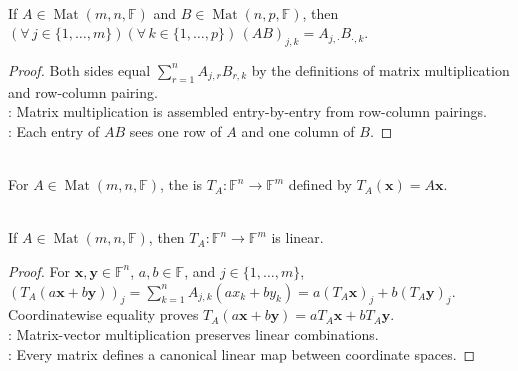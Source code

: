 \begin{proposition} \label{prop:matrix-product-entry-row-column} \\
If $A\in\operatorname{Mat}(m,n,\mathbb{F})$ and $B\in\operatorname{Mat}(n,p,\mathbb{F})$, then $(\forall\,j\in\{1,\ldots,m\})(\forall\,k\in\{1,\ldots,p\})\,(AB)_{j,k}=A_{j,\cdot}B_{\cdot,k}$.
\begin{proof}
Both sides equal $\sum\limits_{r=1}^{n}A_{j,r}B_{r,k}$ by the definitions of matrix multiplication and row-column pairing.\\
: Matrix multiplication is assembled entry-by-entry from row-column pairings.\\
: Each entry of $AB$ sees one row of $A$ and one column of $B$.
\end{proof}
\end{proposition}

\begin{definition} \label{def:linear-map-induced-by-matrix} \\
For $A\in\operatorname{Mat}(m,n,\mathbb{F})$, the  is $T_A:\mathbb{F}^n\to\mathbb{F}^m$ defined by $T_A(\mathbf{x})=A\mathbf{x}$.
\end{definition}

\begin{proposition} \label{prop:matrix-induced-map-linear} \\
If $A\in\operatorname{Mat}(m,n,\mathbb{F})$, then $T_A:\mathbb{F}^n\to\mathbb{F}^m$ is linear.
\begin{proof}
For $\mathbf{x},\mathbf{y}\in\mathbb{F}^n$, $a,b\in\mathbb{F}$, and $j\in\{1,\ldots,m\}$, $(T_A(a\mathbf{x}+b\mathbf{y}))_j=\sum\limits_{k=1}^{n}A_{j,k}(ax_k+by_k)=a(T_A\mathbf{x})_j+b(T_A\mathbf{y})_j$.\\
Coordinatewise equality proves $T_A(a\mathbf{x}+b\mathbf{y})=aT_A\mathbf{x}+bT_A\mathbf{y}$.\\
: Matrix-vector multiplication preserves linear combinations.\\
: Every matrix defines a canonical linear map between coordinate spaces.
\end{proof}
\end{proposition}

